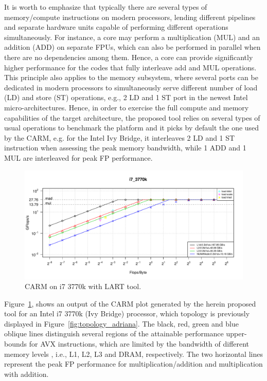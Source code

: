 \documentclass[twoside,twocolumn,8pt]{extarticle}
\begin{document}
It is worth to emphasize that typically there are several types of memory/compute instructions on modern processors, lending
different pipelines and separate hardware units capable of performing different operations simultaneously. For instance, a core
may perform a multiplication (MUL) and an addition (ADD) on separate FPUs, which  can also be performed in parallel when there are
no  dependencies among them. Hence, a core can provide significantly higher  performance for the codes that fully interleave add
and MUL operations. This principle also applies to the memory subsystem, where several ports can be dedicated in modern processors
to simultaneously serve different number of load (LD) and store (ST) operations, e.g., 2 LD and 1 ST port in the newest Intel
micro-architectures. Hence, in order to exercise the full  compute and memory capabilities of the target architecture, the proposed
tool   relies on several types of usual operations to benchmark the platform and it picks by default the one used by the CARM, e.g.
for the Intel Ivy Bridge, it interleaves 2 LD and 1 ST instruction  when assessing the peak memory bandwidth, while 1 ADD and 1 MUL
are interleaved for peak FP performance. 

\begin{figure}
  \includegraphics[width=\textwidth]{pictures/roofline_model}
  \caption{CARM on i7 3770k with LART tool.}
  \label{fig:LART_adriana}
\end{figure}

Figure~\ref{fig:LART_adriana}, shows an output of the CARM plot generated by the herein proposed tool for an Intel i7
3770k (Ivy Bridge) processor, which topology is previously displayed in Figure~\ref{fig:topology_adriana}.
The black, red, green and blue oblique lines distinguish several regions of the attainable performance upper-bounds for AVX
instructions, which are limited by the bandwidth of different memory levels , i.e., L1, L2, L3 and DRAM, respectively.
The two horizontal lines represent the peak FP performance for multiplication/addition and multiplication with addition. 
\end{document}
